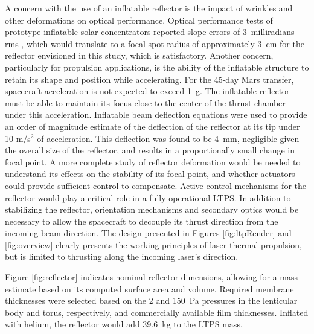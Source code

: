 \documentclass[final,3p,times,twocolumn,sort&compress, lefttitle]{elsarticle}
\newcommand{\rev}[1]{\textcolor{red}{#1}}
\renewcommand{\rev}[1]{#1}  %
\begin{document}
        
            A concern with the use of an inflatable reflector is the impact of wrinkles and other deformations on optical performance. Optical performance tests of prototype inflatable solar concentrators reported slope errors of 3~milliradians rms \cite{grossman_inflatable_1990}, which would translate to a focal spot radius of approximately 3~cm for the reflector envisioned in this study, which is satisfactory. Another concern, particularly for propulsion applications, is the ability of the inflatable structure to retain its shape and position while accelerating. For the 45-day Mars transfer, spacecraft acceleration is not expected to exceed 1~g. The inflatable reflector must be able to maintain its focus close to the center of the thrust chamber under this acceleration. Inflatable beam deflection equations \cite{suhey_numerical_2005} were used to provide an order of magnitude estimate of the deflection of the reflector at its tip under 10 m/s$^2$ of acceleration. This deflection was found to be 4~mm, negligible given the overall size of the reflector, and results in a proportionally small change in focal point. A more complete study of reflector deformation would be needed to understand its effects on the stability of its focal point, and whether actuators could provide sufficient control to compensate. \rev{Active control mechanisms for the reflector would play a critical role in a fully operational LTPS. In addition to stabilizing the reflector, orientation mechanisms and secondary optics would be necessary to allow the spacecraft to decouple its thrust direction from the incoming beam direction. The design presented in Figures \ref{fig:ltpRender} and \ref{fig:overview} clearly presents the working principles of laser-thermal propulsion, but is limited to thrusting along the incoming laser's direction.}
            
            Figure \ref{fig:reflector} indicates nominal reflector dimensions, allowing for a mass estimate based on its computed surface area and volume. Required membrane thicknesses were selected based on  the 2 and 150~Pa pressures in the lenticular body and torus, respectively, and commercially available film thicknesses. Inflated with helium, the reflector would add 39.6~kg to the LTPS mass.
            
        
\end{document}
